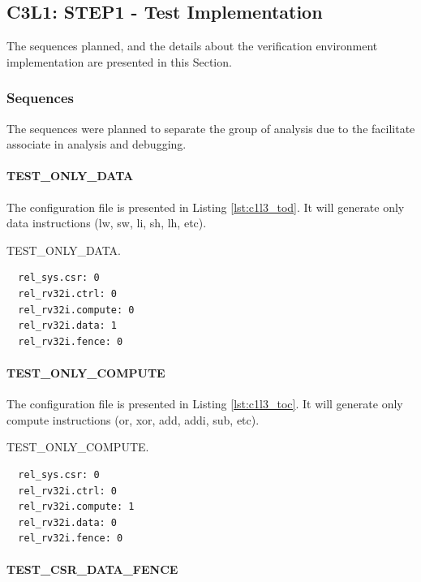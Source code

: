 \subsection{C3L1: STEP1 - Test Implementation}

The sequences planned, and the details about the verification environment implementation are presented in this Section.

\subsubsection{Sequences}

The sequences were planned to separate the group of analysis due to the facilitate associate in analysis and debugging.

\paragraph{TEST\_ONLY\_DATA}

The configuration file is presented in Listing \ref{lst:c1l3_tod}. It will generate only data instructions (lw, sw, li, sh, lh, etc).

\begin{listing}[h!]
\caption{TEST\_ONLY\_DATA.}
\label{lst:c1l3_tod}
\begin{verbatim}
  rel_sys.csr: 0
  rel_rv32i.ctrl: 0
  rel_rv32i.compute: 0
  rel_rv32i.data: 1
  rel_rv32i.fence: 0
\end{verbatim}
\end{listing}

\paragraph{TEST\_ONLY\_COMPUTE}

The configuration file is presented in Listing \ref{lst:c1l3_toc}. It will generate only compute instructions (or, xor, add, addi, sub, etc).

\begin{listing}[h]
\caption{TEST\_ONLY\_COMPUTE.}
\label{lst:c1l3_toc}
\begin{verbatim}
  rel_sys.csr: 0
  rel_rv32i.ctrl: 0
  rel_rv32i.compute: 1
  rel_rv32i.data: 0
  rel_rv32i.fence: 0
\end{verbatim}
\end{listing}

\paragraph{TEST\_CSR\_DATA\_FENCE}


